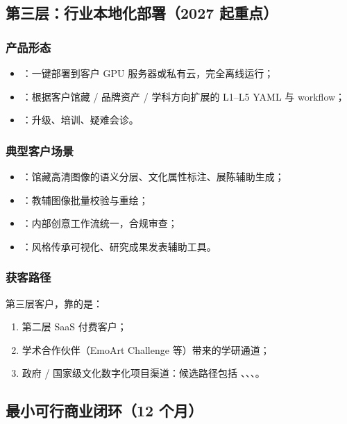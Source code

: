\subsection{第三层：行业本地化部署（2027 起重点）}

\subsubsection*{产品形态}
\begin{itemize}
  \item {}：一键部署到客户 GPU 服务器或私有云，完全离线运行；
  \item {}：根据客户馆藏 / 品牌资产 / 学科方向扩展的 L1–L5 YAML 与 workflow；
  \item {}：升级、培训、疑难会诊。
\end{itemize}

\subsubsection*{典型客户场景}

\begin{itemize}
  \item {}：馆藏高清图像的语义分层、文化属性标注、展陈辅助生成；
  \item {}：教辅图像批量校验与重绘；
  \item {}：内部创意工作流统一，合规审查；
  \item {}：风格传承可视化、研究成果发表辅助工具。
\end{itemize}

\subsubsection*{获客路径}
第三层客户，靠的是：
\begin{enumerate}
  \item 第二层 SaaS 付费客户；
  \item 学术合作伙伴（EmoArt Challenge 等）带来的学研通道；
  \item 政府 / 国家级文化数字化项目渠道：候选路径包括 、、、。
\end{enumerate}

\subsection{最小可行商业闭环（12 个月）}

